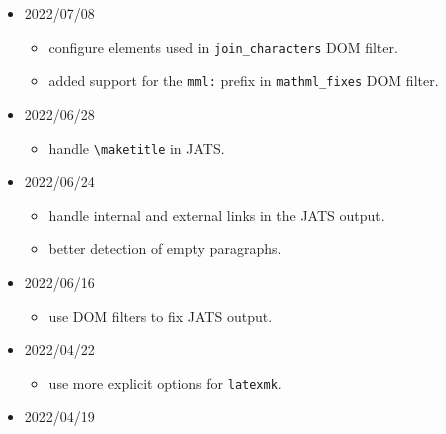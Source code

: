 \begin{itemize}
  \begin{itemize}
  \tightlist
  \item
    \texttt{mathmlfixes} DOM filter:

    \begin{itemize}
    \tightlist
    \item
      don't change \texttt{\textless{}mo\textgreater{}} to
      \texttt{\textless{}mtext\textgreater{}} if the element contain the
      \texttt{stretchy} attribute.
    \item
      add \texttt{\textless{}mtext\textgreater{}} to
      \texttt{\textless{}mstyle\textgreater{}} if it contains only plain
      text
    \end{itemize}
  \end{itemize}
\item
  2022/07/08

  \begin{itemize}
  \tightlist
  \item
    configure elements used in \texttt{join\_characters} DOM filter.
  \item
    added support for the \texttt{mml:} prefix in \texttt{mathml\_fixes}
    DOM filter.
  \end{itemize}
\item
  2022/06/28

  \begin{itemize}
  \tightlist
  \item
    handle \texttt{\textbackslash{}maketitle} in JATS.
  \end{itemize}
\item
  2022/06/24

  \begin{itemize}
  \tightlist
  \item
    handle internal and external links in the JATS output.
  \item
    better detection of empty paragraphs.
  \end{itemize}
\item
  2022/06/16

  \begin{itemize}
  \tightlist
  \item
    use DOM filters to fix JATS output.
  \end{itemize}
\item
  2022/04/22

  \begin{itemize}
  \tightlist
  \item
    use more explicit options for \texttt{latexmk}.
  \end{itemize}
\item
  2022/04/19


\end{itemize}
